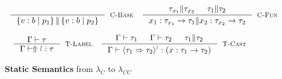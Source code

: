 \begin{figure}[ht!]

\medskip {}
$$\begin{array}{cc}

\inference
  {}
  {\isCompatible{\tref{b}{p_1}}{\tref{b}{p_2}}}
  [\cbase]

&

\inference
  {\isCompatible{\tau_{x_1}}{\tau_{x_2}} &&
   \isCompatible{\tau_1}{\tau_2}}
  {\isCompatible{\tfun{x_1}{\tau_{x_1}}{\tau_1}}{\tfun{x_2}{\tau_{x_2}}{\tau_2}}}
  [\cfunction]
\end{array}$$



\medskip {}
$$\begin{array}{cc}

\inference
  {\isWellFormed{\Gamma}{\tau}}
  {\hastype{\Gamma}{\elabel{l}}{\tau}}
  [\tlabel]
&
\inference
  {\isWellFormed{\Gamma}{\tau_1} &&
   \isWellFormed{\Gamma}{\tau_2} && 
   \isCompatible{\tau_1}{\tau_2}}
  {\hastype{\Gamma}{\ecast{\tau_1}{\tau_2}{l}}{(\tfun{x}{\tau_1}{\tau_2})}}
  [\tcast]
\end{array}$$


\caption{\textbf{Static Semantics} from $\lambda_C$ to $\lambda_{CC}$}
\label{fig:rules}
\end{figure}

